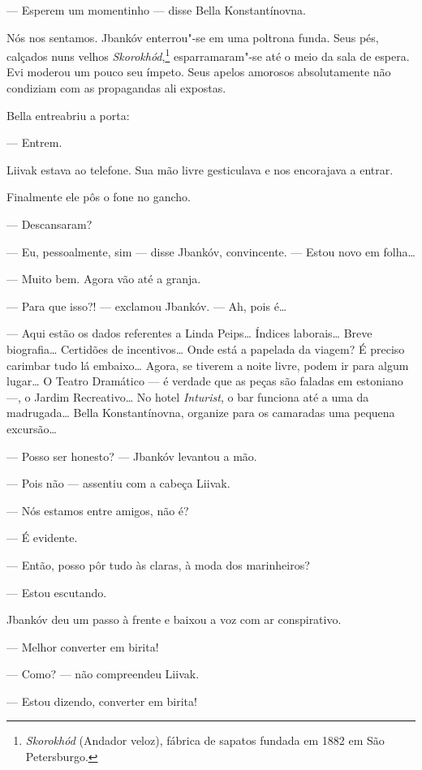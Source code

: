 --- Esperem um momentinho --- disse Bella Konstantínovna.

Nós nos sentamos. Jbankóv enterrou"-se em uma poltrona funda. Seus pés,
calçados nuns velhos \emph{Skorokhód},\footnote{\emph{Skorokhód} (Andador veloz), fábrica de sapatos fundada em 1882 em São Petersburgo.} esparramaram"-se até o meio da
sala de espera. Evi moderou um pouco seu ímpeto. Seus apelos amorosos
absolutamente não condiziam com as propagandas ali expostas.

Bella entreabriu a porta:

--- Entrem.

Liivak estava ao telefone. Sua mão livre gesticulava e nos encorajava a
entrar.

Finalmente ele pôs o fone no gancho.

--- Descansaram?

--- Eu, pessoalmente, sim --- disse Jbankóv, convincente.
--- Estou novo em folha\ldots{}

--- Muito bem. Agora vão até a granja.

--- Para que isso?! --- exclamou Jbankóv. --- Ah,
pois é\ldots{}

--- Aqui estão os dados referentes a Linda Peips\ldots{} Índices
laborais\ldots{} Breve biografia\ldots{} Certidões de incentivos\ldots{} Onde está a
papelada da viagem? É preciso carimbar tudo lá embaixo\ldots{} Agora, se
tiverem a noite livre, podem ir para algum lugar\ldots{} O Teatro Dramático
--- é verdade que as peças são faladas em estoniano ---, o
Jardim Recreativo\ldots{} No hotel \emph{Inturist}, o bar funciona até a uma
da madrugada\ldots{} Bella Konstantínovna, organize para os camaradas uma
pequena excursão\ldots{}

--- Posso ser honesto? --- Jbankóv levantou a mão.

--- Pois não --- assentiu com a cabeça Liivak.

--- Nós estamos entre amigos, não é?

--- É evidente.

--- Então, posso pôr tudo às claras, à moda dos marinheiros?

--- Estou escutando.

Jbankóv deu um passo à frente e baixou a voz com ar conspirativo.

--- Melhor converter em birita!

--- Como? --- não compreendeu Liivak.

--- Estou dizendo, converter em birita!

